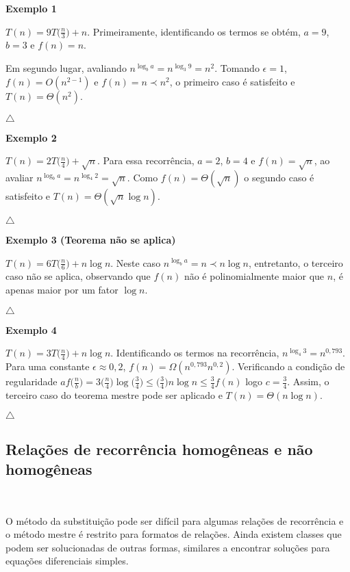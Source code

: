 \textbf{Exemplo 1}

$T(n)=9T\Bigr(\frac{n}{3}\Bigr) + n$. Primeiramente, identificando os termos se obtém, $a=9$, $b=3$ e $f(n)=n$.

Em segundo lugar, avaliando $n^{\log_ba}=n^{\log_3 9} = n^2$. Tomando $\epsilon = 1$, $f(n) = O(n^{2-1})$ e $f(n) = n \prec n^2$, o primeiro caso é satisfeito e $T(n) = \Theta(n^2).$

{\raggedleft $\bigtriangleup$ \par}

\textbf{Exemplo 2}

$T(n) = 2T\Bigr(\frac{n}{4}\Bigr) + \sqrt{n}$. Para essa recorrência, $a = 2$, $b = 4$ e $f(n) = \sqrt{n}$, ao avaliar $n^{\log_ba}=n^{\log_4 2} = \sqrt{n}$. Como $f(n) = \Theta(\sqrt{n})$ o segundo caso é satisfeito e $T(n) = \Theta(\sqrt{n}\log n)$.

{\raggedleft $\bigtriangleup$ \par}

\textbf{Exemplo 3 (Teorema não se aplica)}

$T(n) = 6T\Bigr(\frac{n}{6}\Bigr) + {n \log n}$. Neste caso $n^{\log_ba} = n \prec n \log n$, entretanto, o terceiro caso não se aplica, observando que $f(n)$ não é polinomialmente maior que $n$, é apenas maior por um fator $\log n$.

{\raggedleft $\bigtriangleup$ \par}

\textbf{Exemplo 4}

$T(n) = 3T\Bigr(\frac{n}{4}\Bigr) + {n \log n}$. Identificando os termos na recorrência, $n^{\log_4 3} = n^{0,793}$. Para uma constante $\epsilon \approx 0,2$, $f(n) = \Omega(n^{0,793}n^{0,2})$. Verificando a condição de regularidade $af\Bigr(\frac{n}{b}\Bigr) = 3\Bigr(\frac{n}{4}\Bigr)\log\Bigr(\frac{3}{4}\Bigr) \leq \Bigr(\frac{3}{4}\Bigr) n \log n \leq \frac{3}{4}f(n)$ logo $c=\frac{3}{4}$. Assim, o terceiro caso do teorema mestre pode ser aplicado e $T(n) = \Theta (n \log n)$.

{\raggedleft $\bigtriangleup$ \par}

\subsection{Relações de recorrência homogêneas e não homogêneas}
\

O método da substituição pode ser difícil para algumas relações de recorrência e o método mestre é restrito para formatos de relações. Ainda existem classes que podem ser solucionadas de outras formas, similares a encontrar soluções para equações diferenciais simples.

